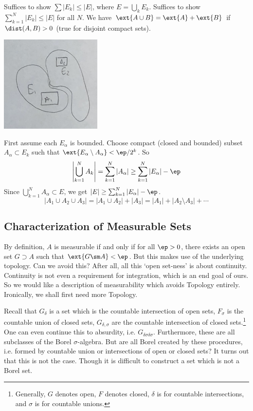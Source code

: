 \pf Suffices to show $\sum |E_k| \leq |E|$, where $E= \bigcup_k E_k$. Suffices to show $\sum_{k=1}^N |E_k| \leq |E|$ for all $N$. We have $\ext{A \cup B}= \ext{A} + \ext{B}$ if $\dist(A,B)>0$ (true for disjoint compact sets). 


   \includegraphics[width=2in]{rep2.png} 



First assume each $E_\alpha$ is bounded. Choose compact (closed and bounded) subset $A_\alpha \subset E_k$ such that $\ext{E_\alpha \setminus A_\alpha} < \ep/2^k$. So 
	\[
	\left| \bigcup_{k=1}^N A_k \right| = \sum_{k=1}^N |A_\alpha| \geq \sum_{k=1}^N |E_\alpha| - \ep 
	\]
Since $\bigcup_{k=1}^N A_\alpha \subset E$, we get $|E| \geq \sum_{k=1}^N |E_\alpha| - \ep$.
	\[
	|A_1 \cup A_2 \cup A_3| = |A_1 \cup A_2| + |A_3| = |A_1| + |A_2 \setminus A_3| + \cdots 
	\]

















 \subsection{Characterization of Measurable Sets}
 
 By definition, $A$ is measurable if and only if for all $\ep>0$, there exists an open set $G \supset A$ such that $\ext{G \sm A}<\ep$. But this makes use of the underlying topology. Can we avoid this? After all, all this `open set-ness' is about continuity. Continuity is not even a requirement for integration, which is an end goal of ours. So we would like a description of measurability which avoids Topology entirely. Ironically, we shall first need more Topology.
 
 Recall that $G_\delta$ is a set which is the countable intersection of open sets, $F_\sigma$ is the countable union of closed sets, $G_{\delta,\sigma}$ are the countable intersection of closed sets.\footnote{Generally, $G$ denotes open, $F$ denotes closed, $\delta$ is for countable intersections, and $\sigma$ is for countable unions.} One can even continue this to absurdity, i.e. $G_{\delta\sigma\delta\sigma}$. Furthermore, these are all subclasses of the Borel $\sigma$-algebra. But are all Borel created by these procedures, i.e. formed by countable union or intersections of open or closed sets? It turns out that this is not the case. Though it is difficult to construct a set which is not a Borel set. 
 
